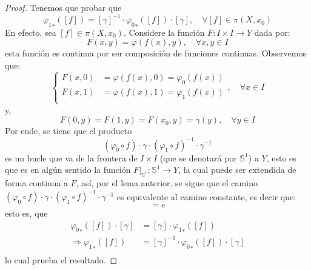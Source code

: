 \documentclass[12pt]{report}
\theoremstyle{largebreak}
\newcommand\cf[3]{\ensuremath{#1:#2\rightarrow#3}}
\begin{document}
    \begin{proof}
        Tenemos que probar que
        \begin{equation*}
            {\varphi_1}_*\left([f]\right)=[\gamma]^{-1}\cdot{\varphi_0}_*\left([f]\right)\cdot[\gamma],\quad\forall [f]\in\pi(X,x_0)
        \end{equation*}
        En efecto, sea $[f]\in\pi(X,x_0)$. Considere la función $\cf{F}{I\times I}{Y}$ dada por:
        \begin{equation*}
            F(x,y)=\varphi(f(x),y),\quad\forall x,y\in I
        \end{equation*}
        esta función es continua por ser composición de funciones continuas. Observemos que:
        \begin{equation*}
            \left\{ 
                \begin{split}
                    F(x,0) & = \varphi(f(x),0)=\varphi_0(f(x)) \\
                    F(x,1) & = \varphi(f(x),1)=\varphi_1(f(x)) \\
                \end{split}
            \right.,\quad\forall x\in I
        \end{equation*}
        y,
        \begin{equation*}
            F(0,y)=F(1,y)=F(x_0,y)=\gamma(y),\quad\forall y\in I
        \end{equation*}
        Por ende, se tiene que el producto
        \begin{equation*}
            \left(\varphi_0\circ f \right)\cdot\gamma\cdot\left(\varphi_1\circ f \right)^{-1}\cdot\gamma^{-1}
        \end{equation*}
        es un bucle que va de la frontera de $I\times I$ (que se denotará por $\mathbb{S}^1$) a $Y$, esto es que es en algún sentido la función $\cf{F\big|_{\mathbb{S}^1}}{\mathbb{S}^1}{Y}$, la cual puede ser extendida de forma continua a $F$, así, por el lema anterior, se sigue que el camino $\left(\varphi_0\circ f \right)\cdot\gamma\cdot\left(\varphi_1\circ f \right)^{-1}\cdot\gamma^{-1}$ es equivalente al camino constante, es decir que:
        \begin{equation*}
            [\left(\varphi_0\circ f \right)\cdot\gamma\cdot\left(\varphi_1\circ f \right)^{-1}\cdot\gamma^{-1}]=e
        \end{equation*}
        esto es, que
        \begin{equation*}
            \begin{split}
                {\varphi_0}_*\left([f]\right)\cdot[\gamma]&=[\gamma]\cdot{\varphi_1}_*\left([f]\right)\\
                \Rightarrow {\varphi_1}_*\left([f]\right)&=[\gamma]^{-1}\cdot{\varphi_0}_*\left([f]\right)\cdot[\gamma]\\
            \end{split}
        \end{equation*}
        lo cual prueba el resultado.
    \end{proof}
\end{document}
